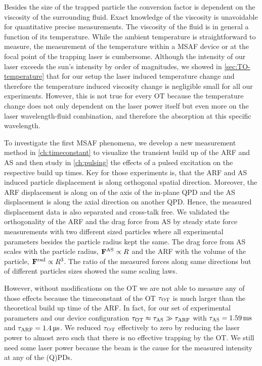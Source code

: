 Besides the size of the trapped particle the conversion factor is dependent on 
the viscosity of the surrounding fluid. Exact knowledge of the viscosity is 
unavoidable for quantitative precise measurements. The viscosity of the fluid 
is in general a function of its temperature. While the ambient temperature is 
straightforward to measure, the measurement of the temperature within a MSAF 
device or at the focal point of the trapping laser is cumbersome. Although the 
intensity of our laser exceeds the sun's intensity by order of magnitudes, we 
showed in \cref{sec:TO-temperature} that for our setup the laser induced 
temperature change and therefore the temperature induced viscosity change is 
negligible small for all our experiments. However, this is not true for every 
OT because the temperature change does not only dependent on the laser power 
itself but even more on the laser wavelength-fluid combination, and therefore 
the absorption at this specific wavelength.

To investigate the first MSAF phenomena, we develop a new measurement method in 
\cref{ch:timeconstant} to visualize the transient build up of the ARF and AS 
and then study in \cref{ch:pulsing} the effects of a pulsed excitation on the 
respective build up times. Key for those experiments is, that the ARF and AS 
induced particle displacement is along orthogonal spatial direction. Moreover, 
the ARF displacement is along on of the axis of the in-plane QPD and the AS 
displacement is along the axial direction on another QPD. Hence, the measured 
displacement data is also separated and cross-talk free. We validated the 
orthogonality of the ARF and the drag force from AS by steady state force 
measurements with two different sized particles where all experimental 
parameters besides the particle radius kept the same. The drag force from AS 
scales with the particle radius, $\vb{F}^{\mathrm{AS}}\propto R$ and the ARF with the volume of 
the particle, $\vb{F}^{\mathrm{rad}}\propto R^{3}$. The ratio of the measured forces along same 
directions but of different particles sizes showed the same scaling laws. 

However, without modifications on the OT we are not able to measure any of 
those effects because the timeconstant of the OT $\tau_{\mathrm{OT}}$ is much larger than the 
theoretical build up time of the ARF. In fact, for our set of experimental 
parameters and our device configuration $\tau_{\mathrm{OT}} \approx \tau_{\mathrm{AS}} \gg \tau_{\mathrm{ARF}}$ with 
$\tas = \SI{1.59}{\ms}$ and $\tarf = \SI{1.4}{\us}$. We reduced $\tau_{\mathrm{OT}}$ 
effectively to zero by reducing the laser power to almost zero such that there 
is no effective trapping by the OT. We still need some laser power because the 
beam is the cause for the measured intensity at any of the (Q)PDs.

